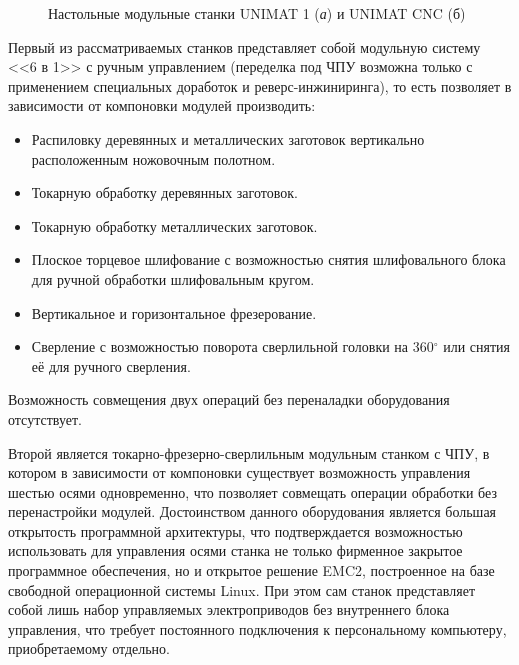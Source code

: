\begin{figure}[ht]
	\caption[Настольные модульные станки UNIMAT 1 и UNIMAT CNC]{Настольные модульные станки UNIMAT 1 (\textit{а}) и UNIMAT CNC (б)}\label{fig:unimat}
\end{figure}

Первый из рассматриваемых станков представляет собой модульную систему <<6 в 1>> с ручным управлением (переделка под ЧПУ возможна только с применением специальных доработок и реверс-инжиниринга), то есть позволяет в зависимости от компоновки модулей производить:

\begin{itemize}
	\item Распиловку деревянных и металлических заготовок вертикально расположенным ножовочным полотном.
	\item Токарную обработку деревянных заготовок.
	\item Токарную обработку металлических заготовок.
	\item Плоское торцевое шлифование с возможностью снятия шлифовального блока для ручной обработки шлифовальным кругом.
	\item Вертикальное и горизонтальное фрезерование.
	\item Сверление с возможностью поворота сверлильной головки на 360$^{\circ}$ или снятия её для ручного сверления.
\end{itemize}

Возможность совмещения двух операций без переналадки оборудования отсутствует.

Второй является токарно-фрезерно-сверлильным модульным станком с ЧПУ, в котором в зависимости от компоновки существует возможность управления шестью осями одновременно, что позволяет совмещать операции обработки без перенастройки модулей. Достоинством данного оборудования является большая открытость программной архитектуры, что подтверждается возможностью использовать для управления осями станка не только фирменное закрытое программное обеспечения, но и открытое решение EMC2, построенное на базе свободной операционной системы Linux. При этом сам станок представляет собой лишь набор управляемых электроприводов без внутреннего блока управления, что требует постоянного подключения к персональному компьютеру, приобретаемому отдельно.

